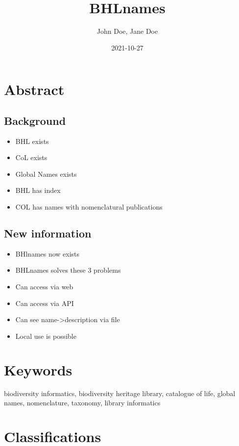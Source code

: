 \documentclass[
]{article}
\title{BHLnames}
\author{John Doe, Jane Doe}
\date{2021-10-27}
\providecommand{\tightlist}{%
  \setlength{\itemsep}{0pt}\setlength{\parskip}{0pt}}
\begin{document}
\maketitle

\hypertarget{abstract}{%
\section{Abstract}\label{abstract}}

\hypertarget{background}{%
\subsection{Background}\label{background}}

\begin{itemize}
\tightlist
\item
  BHL exists
\item
  CoL exists
\item
  Global Names exists
\item
  BHL has index
\item
  COL has names with nomenclatural publications
\end{itemize}

\hypertarget{new-information}{%
\subsection{New information}\label{new-information}}

\begin{itemize}
\tightlist
\item
  BHlnames now exists
\item
  BHLnames solves these 3 problems
\item
  Can access via web
\item
  Can access via API
\item
  Can see name-\textgreater description via file
\item
  Local use is possible
\end{itemize}

\hypertarget{keywords}{%
\section{Keywords}\label{keywords}}

biodiversity informatics, biodiversity heritage library, catalogue of
life, global names, nomenclature, taxonomy, library informatics

\hypertarget{classifications}{%
\section{Classifications}\label{classifications}}
\end{document}
